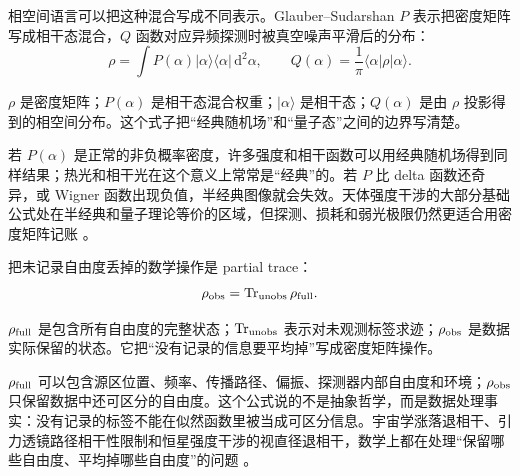 相空间语言可以把这种混合写成不同表示。Glauber--Sudarshan \(P\) 表示把密度矩阵写成相干态混合，\(Q\) 函数对应异频探测时被真空噪声平滑后的分布：
\begin{equation}
  \rho=\int P(\alpha)|\alpha\rangle\langle\alpha|\,\mathrm{d}^2\alpha,
  \qquad
  Q(\alpha)=\frac{1}{\pi}\langle\alpha|\rho|\alpha\rangle .
  \label{eq:ch03-phase-space}
\end{equation}
\begin{formulaexplain}
\(\rho\) 是密度矩阵；\(P(\alpha)\) 是相干态混合权重；\(|\alpha\rangle\) 是相干态；\(Q(\alpha)\) 是由 \(\rho\) 投影得到的相空间分布。这个式子把“经典随机场”和“量子态”之间的边界写清楚。
\end{formulaexplain}
若 \(P(\alpha)\) 是正常的非负概率密度，许多强度和相干函数可以用经典随机场得到同样结果；热光和相干光在这个意义上常常是“经典”的。若 \(P\) 比 delta 函数还奇异，或 Wigner 函数出现负值，半经典图像就会失效。天体强度干涉的大部分基础公式处在半经典和量子理论等价的区域，但探测、损耗和弱光极限仍然更适合用密度矩阵记账 \citep{1963PhRvL..10..277S,1972PhRvA...6.2211A,2001qops.book.....S,1996PhRvL..76.4344B,1999PhRvA..60..674B}。

把未记录自由度丢掉的数学操作是 partial trace：
\begin{equation}
  \rho_{\rm obs}=\operatorname{Tr}_{\rm unobs}\rho_{\rm full}.
  \label{eq:ch03-partial-trace}
\end{equation}
\begin{formulaexplain}
\(\rho_{\rm full}\) 是包含所有自由度的完整状态；\(\operatorname{Tr}_{\rm unobs}\) 表示对未观测标签求迹；\(\rho_{\rm obs}\) 是数据实际保留的状态。它把“没有记录的信息要平均掉”写成密度矩阵操作。
\end{formulaexplain}
\(\rho_{\rm full}\) 可以包含源区位置、频率、传播路径、偏振、探测器内部自由度和环境；\(\rho_{\rm obs}\) 只保留数据中还可区分的自由度。这个公式说的不是抽象哲学，而是数据处理事实：没有记录的标签不能在似然函数里被当成可区分信息。宇宙学涨落退相干、引力透镜路径相干性限制和恒星强度干涉的视直径退相干，数学上都在处理“保留哪些自由度、平均掉哪些自由度”的问题 \citep{1998RvMP...70..101P,2020MNRAS.491.5789L,1996CQGra..13..377P}。

